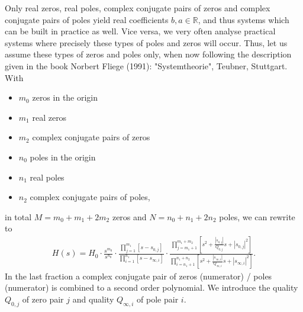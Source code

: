 Only real zeros, real poles, complex conjugate pairs of zeros and
complex conjugate pairs of poles yield
real coefficients $b,a \in \mathbb{R}$, and thus systems which can be built in
practice as well.
%
Vice versa, we very often analyse practical systems where precisely these types
of poles and zeros will occur.
%
Thus, let us assume these types of zeros and poles only, when now following the
description given in the book Norbert Fliege (1991): "Systemtheorie", Teubner,
Stuttgart.
%
With
\begin{itemize}
\item $m_0$ zeros in the origin
\item $m_1$ real zeros
\item $m_2$ complex conjugate pairs of zeros
\item $n_0$ poles in the origin
\item $n_1$ real poles
\item $n_2$ complex conjugate pairs of poles,
\end{itemize}
in total $M = m_0 + m_1 + 2 m_2$ zeros and $N = n_0 + n_1 + 2 n_2$ poles,
we can rewrite  to
\begin{align}
\label{eq:Hs_sorted_for_Bode}
H(s) = H_0
\cdot
\frac
{s^{m_0}}
{s^{n_0}}
\cdot
\frac
{\prod\limits_{j=1}^{m_1} [s-s_{0,j}]}
{\prod\limits_{i=1}^{n_1} [s-s_{\infty,i}]}
\cdot
\frac
{\prod\limits_{j=m_1+1}^{m_1+m_2} [s^2 + \frac{|s_{0,j}|}{Q_{0,j}} s + |s_{0,j}|^2]}
{\prod\limits_{i=n_1+1}^{n_1+n_2} [s^2 + \frac{|s_{\infty,i}|}{Q_{\infty,i}} s + |s_{\infty,i}|^2]}.
\end{align}
%
In the last fraction a complex conjugate pair of zeros (numerator)
/ poles (numerator) is combined to a second order polynomial.
We introduce the quality $Q_{0,j}$ of zero pair $j$ and
quality $Q_{\infty,i}$ of pole pair $i$.


